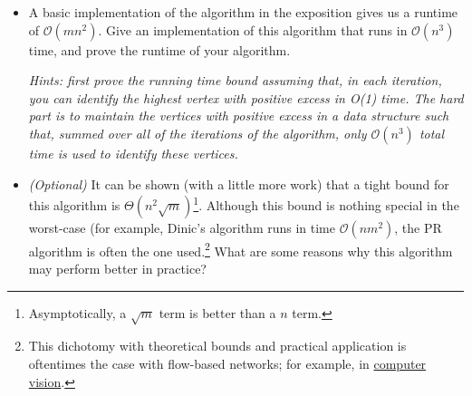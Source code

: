 \documentclass{article}
\begin{document}
\begin{itemize}
\begin{center}
    \end{center}
    \item[(b)] A basic implementation of the algorithm in the exposition gives us a runtime of $\mathcal{O}(mn^{2})$. Give an implementation of this algorithm that runs in $\mathcal{O}(n^{3})$ time, and prove the runtime of your algorithm.

    \vspace{2mm} \textit{Hints: first prove the running time bound assuming that, in each iteration, you can identify the highest vertex with positive excess in O(1) time. The hard part is to maintain the vertices with positive excess in a data structure such that, summed over all of the iterations of the algorithm, only $\mathcal{O}(n^{3})$ total time is used to identify these vertices.}
    \item[(c)] \textit{(Optional)} It can be shown (with a little more work) that a tight bound for this algorithm is $\Theta(n^{2}\sqrt{m})$\footnote{Asymptotically, a $\sqrt{m}$ term is better than a $n$ term.}. Although this bound is nothing special in the worst-case (for example, Dinic's algorithm runs in time $\mathcal{O}(nm^{2})$, the PR algorithm is often the one used.\footnote{This dichotomy with theoretical bounds and practical application is oftentimes the case with flow-based networks; for example, in \href{https://www.csd.uwo.ca/~yboykov/Papers/pami04.pdf}{computer vision}.} What are some reasons why this algorithm may perform better in practice?
\end{itemize}
\end{document}
